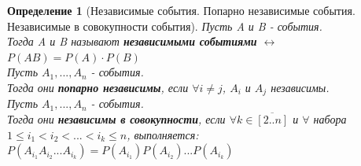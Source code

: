 \documentclass[14pt]{extarticle}
\theoremstyle{breakstyle}
\newtheorem{definition}{Определение}[subsection]
\begin{document}
\begin{definition}[Независимые события. Попарно независимые события. Независимые в совокупности события]

Пусть A и B - события. \\
Тогда A и B называют \textbf{независимыми событиями} $\leftrightarrow$ $P(AB) = P(A) \cdot P(B)$ \\

Пусть $A_{1}, ... , A_{n}$ - события. \\
Тогда они \textbf{попарно независимы}, если $\forall i \neq j$, $A_{i}$ и $A_{j}$ независимы. \\

Пусть $A_{1}, ... , A_{n}$ - события. \\
Тогда они \textbf{независимы в совокупности}, если $\forall k \in \overline{[2..n]}$ и $\forall$ набора $1 \leq i_{1} < i_{2} < ... < i_{k} \leq n$, выполняется: $P(A_{i_{1}}A_{i_{2}}...A_{i_k}) = P(A_{i_{1}})P(A_{i_{2}})...P(A_{i_{k}})$

\end{definition}
\end{document}
